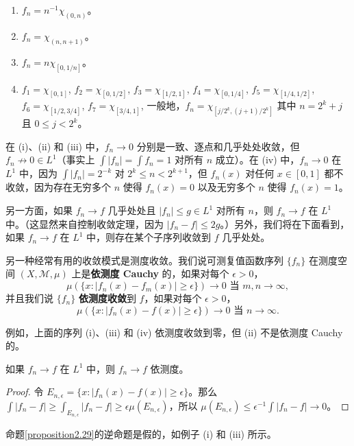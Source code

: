 \documentclass[lang=cn,10pt,thmcnt=section]{elegantbook}
\begin{document}
\begin{enumerate}[label=\roman*.]
    \item $f_n = n^{-1}\chi_{(0,n)}$。
    \item $f_n = \chi_{(n,n+1)}$。
    \item $f_n = n\chi_{[0,1/n]}$。
    \item $f_1 = \chi_{[0,1]}$, $f_2 = \chi_{[0,1/2]}$, $f_3 = \chi_{[1/2,1]}$, $f_4 = \chi_{[0,1/4]}$, $f_5 = \chi_{[1/4,1/2]}$, $f_6 = \chi_{[1/2,3/4]}$, $f_7 = \chi_{[3/4,1]}$, 一般地，$f_n = \chi_{[j/2^k, (j+1)/2^k]}$ 其中 $n = 2^k + j$ 且 $0 \leq j < 2^k$。
\end{enumerate}
在 (i)、(ii) 和 (iii) 中，$f_n \to 0$ 分别是一致、逐点和几乎处处收敛，但 $f_n \not\to 0 \in L^1$（事实上 $\int |f_n| = \int f_n = 1$ 对所有 $n$ 成立）。在 (iv) 中，$f_n \to 0$ 在 $L^1$ 中，因为 $\int |f_n| = 2^{-k}$ 对 $2^k \leq n < 2^{k+1}$，但 $f_n(x)$ 对任何 $x \in [0,1]$ 都不收敛，因为存在无穷多个 $n$ 使得 $f_n(x) = 0$ 以及无穷多个 $n$ 使得 $f_n(x) = 1$。

另一方面，如果 $f_n \to f$ 几乎处处且 $|f_n| \leq g \in L^1$ 对所有 $n$，则 $f_n \to f$ 在 $L^1$ 中。（这显然来自控制收敛定理，因为 $|f_n - f| \leq 2g$。）另外，我们将在下面看到，如果 $f_n \to f$ 在 $L^1$ 中，则存在某个子序列收敛到 $f$ 几乎处处。

另一种经常有用的收敛模式是测度收敛。我们说可测复值函数序列 $\{f_n\}$ 在测度空间 $(X, \mathcal{M}, \mu)$ 上是\textbf{依测度 Cauchy} 的，如果对每个 $\epsilon > 0$，
\[ \mu(\{x : |f_n(x) - f_m(x)| \geq \epsilon\}) \to 0 \text{ 当 } m,n \to \infty, \]
并且我们说 $\{f_n\}$ \textbf{依测度收敛}到 $f$，如果对每个 $\epsilon > 0$，
\[ \mu(\{x : |f_n(x) - f(x)| \geq \epsilon\}) \to 0 \text{ 当 } n \to \infty. \]

例如，上面的序列 (i)、(iii) 和 (iv) 依测度收敛到零，但 (ii) 不是依测度 Cauchy 的。

\begin{proposition}\label{proposition2.29}
如果 $f_n \to f$ 在 $L^1$ 中，则 $f_n \to f$ 依测度。
\end{proposition}

\begin{proof}
令 $E_{n,\epsilon} = \{x : |f_n(x)-f(x)| \geq \epsilon\}$。那么 $\int |f_n-f| \geq \int_{E_{n,\epsilon}} |f_n-f| \geq \epsilon\mu(E_{n,\epsilon})$，所以 $\mu(E_{n,\epsilon}) \leq \epsilon^{-1} \int |f_n - f| \to 0$。
\end{proof}

命题\ref{proposition2.29}的逆命题是假的，如例子 (i) 和 (iii) 所示。
\end{document}
